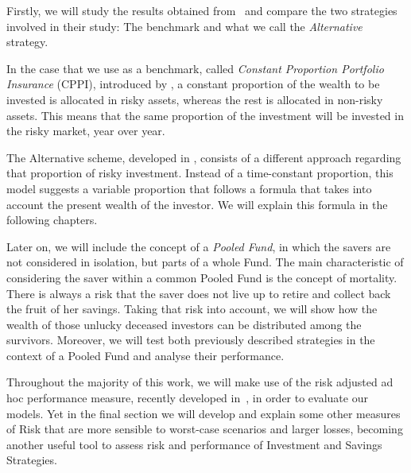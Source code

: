Firstly, we will study the results obtained from~\cite{a:guillen-optimisation} and compare the two strategies involved in their study: The benchmark and what we call the \emph{Alternative} strategy.

In the case that we use as a benchmark, called \textit{Constant Proportion Portfolio Insurance} (CPPI), introduced by \cite{a:perold-constant}, a constant proportion of the wealth to be invested is allocated in risky assets, whereas the rest is allocated in non-risky assets. This means that the same proportion of the investment will be invested in the risky market, year over year.

The Alternative scheme, developed in \cite{a:guillen-optimisation}, consists of a different approach regarding that proportion of risky investment. Instead of a time-constant proportion, this model suggests a variable proportion that follows a formula that takes into account the present wealth of the investor. We will explain this formula in the following chapters.

Later on, we will include the concept of a \emph{Pooled Fund}, in which the savers are not considered in isolation, but parts of a whole Fund. The main characteristic of considering the saver within a common Pooled Fund is the concept of mortality. There is always a risk that the saver does not live up to retire and collect back the fruit of her savings. Taking that risk into account, we will show how the wealth of those unlucky deceased investors can be distributed among the survivors. Moreover, we will test both previously described strategies in the context of a Pooled Fund and analyse their performance.

Throughout the majority of this work, we will make use of the risk adjusted ad hoc performance measure, recently developed in~\cite{a:guillen-performance, a:guillen-guarantee}, in order to evaluate our models. Yet in the final section we will develop and explain some other measures of Risk that are more sensible to worst-case scenarios and larger losses, becoming another useful tool to assess risk and performance of Investment and Savings Strategies.
